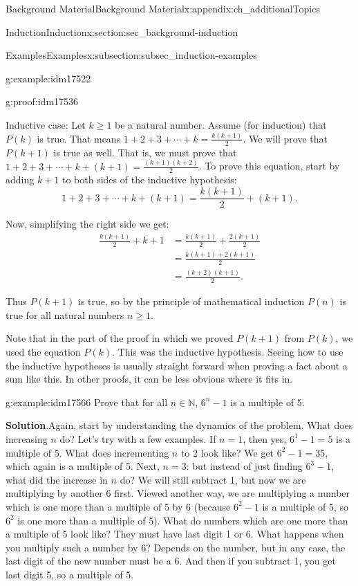 \documentclass[oneside,10pt,]{book}
\numberwithin{equation}{chapter}
\def\N{\mathbb N}
\newcommand{\amp}{&}
\begin{document}
\begin{appendixptx}{Background Material}{}{Background Material}{}{}{x:appendix:ch_additionalTopics}
\begin{sectionptx}{Induction}{}{Induction}{}{}{x:section:sec_background-induction}
\begin{subsectionptx}{Examples}{}{Examples}{}{}{x:subsection:subsec_induction-examples}
\begin{example}{}{g:example:idm17522}
\begin{proofptx}{}{g:proof:idm17536}
\par
Inductive case: Let \(k \ge 1\) be a natural number. Assume (for induction) that \(P(k)\) is true. That means \(1 + 2 + 3 + \cdots + k = \frac{k(k+1)}{2}\). We will prove that \(P(k+1)\) is true as well. That is, we must prove that \(1 + 2 + 3 + \cdots + k + (k+1) = \frac{(k+1)(k+2)}{2}\). To prove this equation, start by adding \(k+1\) to both sides of the inductive hypothesis:%
\begin{equation*}
1 + 2 + 3 + \cdots + k + (k+1) = \frac{k(k+1)}{2} + (k+1).
\end{equation*}
%
\par
Now, simplifying the right side we get:%
\begin{align*}
\frac{k(k+1)}{2} + k+1 \amp = \frac{k(k+1)}{2} + \frac{2(k+1)}{2}\\
\amp = \frac{k(k+1) + 2(k+1)}{2}\\
\amp = \frac{(k+2)(k+1)}{2}.
\end{align*}
%
\par
Thus \(P(k+1)\) is true, so by the principle of mathematical induction \(P(n)\) is true for all natural numbers \(n \ge 1\).%
\end{proofptx}
\end{example}
Note that in the part of the proof in which we proved \(P(k+1)\) from \(P(k)\), we used the equation \(P(k)\). This was the inductive hypothesis. Seeing how to use the inductive hypotheses is usually straight forward when proving a fact about a sum like this. In other proofs, it can be less obvious where it fits in.%
\begin{example}{}{g:example:idm17566}%
Prove that for all \(n \in \N\), \(6^n - 1\) is a multiple of 5.%
\par\smallskip%
\noindent\textbf{Solution}.\hypertarget{g:solution:idm17571}{}\quad{}Again, start by understanding the dynamics of the problem. What does increasing \(n\) do? Let's try with a few examples. If \(n = 1\), then yes, \(6^1 - 1 = 5\) is a multiple of 5. What does incrementing \(n\) to 2 look like? We get \(6^2 - 1 = 35\), which again is a multiple of 5. Next, \(n = 3\): but instead of just finding \(6^3 - 1\), what did the increase in \(n\) do? We will still subtract 1, but now we are multiplying by another 6 first. Viewed another way, we are multiplying a number which is one more than a multiple of 5 by 6 (because \(6^2 - 1\) is a multiple of 5, so \(6^2\) is one more than a multiple of 5). What do numbers which are one more than a multiple of 5 look like? They must have last digit 1 or 6. What happens when you multiply such a number by 6? Depends on the number, but in any case, the last digit of the new number must be a 6. And then if you subtract 1, you get last digit 5, so a multiple of 5.%

\end{example}
\end{subsectionptx}
\end{sectionptx}
\end{appendixptx}
\end{document}

